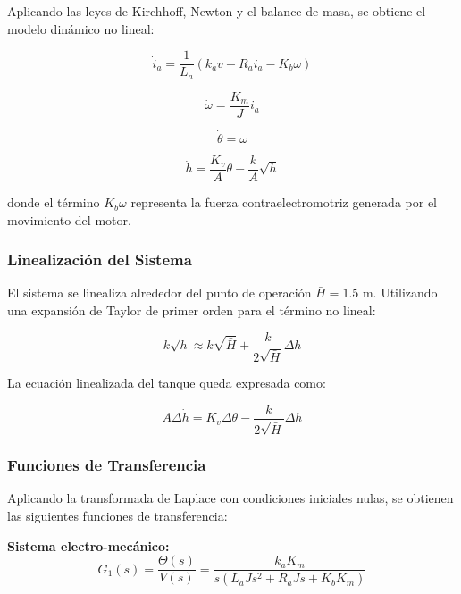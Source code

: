 \documentclass[conference]{IEEEtran}
\begin{document}
Aplicando las leyes de Kirchhoff, Newton y el balance de masa, se obtiene el modelo dinámico no lineal:

\begin{equation}
\dot{i}_a = \frac{1}{L_a}(k_a v - R_a i_a - K_b\omega)
\end{equation}

\begin{equation}
\dot{\omega} = \frac{K_m}{J}i_a
\end{equation}

\begin{equation}
\dot{\theta} = \omega
\end{equation}

\begin{equation}
\dot{h} = \frac{K_v}{A}\theta - \frac{k}{A}\sqrt{h}
\end{equation}

donde el término $K_b\omega$ representa la fuerza contraelectromotriz generada por el movimiento del motor.

\subsubsection{Linealización del Sistema}

El sistema se linealiza alrededor del punto de operación $\bar{H} = 1.5$ m. Utilizando una expansión de Taylor de primer orden para el término no lineal:

\begin{equation}
k\sqrt{h} \approx k\sqrt{\bar{H}} + \frac{k}{2\sqrt{\bar{H}}}\Delta h
\end{equation}

La ecuación linealizada del tanque queda expresada como:

\begin{equation}
A\Delta\dot{h} = K_v\Delta\theta - \frac{k}{2\sqrt{\bar{H}}}\Delta h
\end{equation}

\subsubsection{Funciones de Transferencia}

Aplicando la transformada de Laplace con condiciones iniciales nulas, se obtienen las siguientes funciones de transferencia:

\textbf{Sistema electro-mecánico:}
\begin{equation}
G_1(s) = \frac{\Theta(s)}{V(s)} = \frac{k_a K_m}{s(L_a Js^2 + R_a Js + K_b K_m)}
\end{equation}
\end{document}
